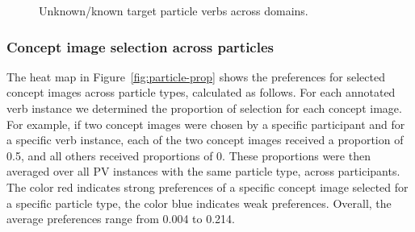 \documentclass[output=paper]{langsci/langscibook}
\begin{document}
\begin{figure}[p]
  \caption{Unknown/known target particle verbs across domains.}
  \label{fig:neo-ratings-domain}\raggedright

\end{figure}


\subsubsection{Concept image selection across particles}

The heat map in Figure~\ref{fig:particle-prop} shows the preferences
for selected concept images across particle types, calculated as
follows. For each annotated verb instance we determined the proportion
of selection for each concept image. For example, if two concept
images were chosen by a specific participant and for a specific verb
instance, each of the two concept images received a proportion of 0.5,
and all others received proportions of 0. These proportions were then
averaged over all PV instances with the same particle type, across
participants. The color red indicates strong preferences of a specific
concept image selected for a specific particle type, the color blue
indicates weak preferences. Overall, the average preferences range
from 0.004 to 0.214.
\end{document}
